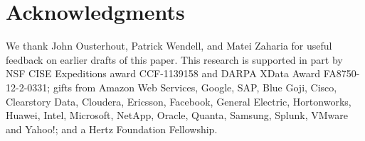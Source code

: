 \section{Acknowledgments}
We thank John Ousterhout, Patrick Wendell, and Matei Zaharia for useful feedback on earlier drafts of this paper.
This research is supported in part by NSF CISE Expeditions award CCF-1139158 and DARPA XData Award FA8750-12-2-0331; gifts from Amazon Web Services, Google, SAP,  Blue Goji, Cisco, Clearstory Data, Cloudera, Ericsson, Facebook, General Electric, Hortonworks, Huawei, Intel, Microsoft, NetApp, Oracle, Quanta, Samsung, Splunk, VMware and Yahoo!; and
a Hertz Foundation Fellowship.
